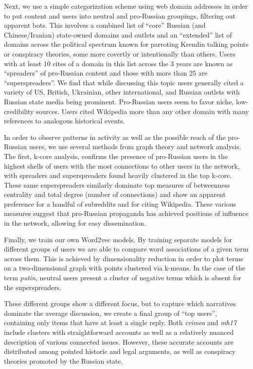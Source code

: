 Next, we use a simple categorization scheme using web domain addresses in order to put content and users into neutral and pro-Russian groupings, filtering out apparent bots.
This involves a combined list of ``core'' Russian (and Chinese/Iranian) state-owned domains and outlets and an ``extended'' list of domains across the political spectrum known for parroting Kremlin talking points or conspiracy theories, some more covertly or intentionally than others.
Users with at least 10 cites of a domain in this list across the 3 years are known as ``spreaders'' of pro-Russian content and those with more than 25 are ``superspreaders''.
We find that while discussing this topic users generally cited a variety of US, British, Ukrainian, other international, and Russian outlets with Russian state media being prominent.
Pro-Russian users seem to favor niche, low-credibility sources.
Users cited Wikipedia more than any other domain with many references to analogous historical events.

In order to observe patterns in activity as well as the possible reach of the pro-Russian users, we use several methods from graph theory and network analysis.
The first, k-core analysis, confirms the presence of pro-Russian users in the highest shells of users with the most connections to other users in the network, with spreaders and superspreaders found heavily clustered in the top k-core.
These same superspreaders similarly dominate top measures of betweenness centrality and total degree (number of connections) and show an apparent preference for a handful of subreddits and for citing Wikipedia.
These various measures suggest that pro-Russian propaganda has achieved positions of influence in the network, allowing for easy dissemination.

Finally, we train our own Word2vec models.
By training separate models for different groups of users we are able to compare word associations of a given term across them.
This is achieved by dimensionality reduction in order to plot terms on a two-dimensional graph with points clustered via k-means.
In the case of the term \emph{putin}, neutral users present a cluster of negative terms which is absent for the superspreaders.

These different groups show a different focus, but to capture which narratives dominate the average discussion, we create a final group of ``top users'', containing only items that have at least a single reply.
Both \emph{crimea} and \emph{mh17} include clusters with straightforward accounts as well as a relatively nuanced description of various connected issues.
However, these accurate accounts are distributed among pointed historic and legal arguments, as well as conspiracy theories promoted by the Russian state.

